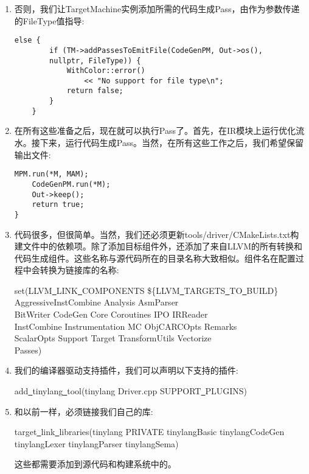 \begin{enumerate}
\item 否则，我们让TargetMachine实例添加所需的代码生成Pass，由作为参数传递的FileType值指导:
\begin{lstlisting}[caption={}]
	 else {
		if (TM->addPassesToEmitFile(CodeGenPM, Out->os(),
		nullptr, FileType)) {
			WithColor::error()
				<< "No support for file type\n";
			return false;
		}
	}
\end{lstlisting}

\item 在所有这些准备之后，现在就可以执行Pass了。首先，在IR模块上运行优化流水。接下来，运行代码生成Pass。当然，在所有这些工作之后，我们希望保留输出文件:
\begin{lstlisting}[caption={}]
	MPM.run(*M, MAM);
	CodeGenPM.run(*M);
	Out->keep();
	return true;
}
\end{lstlisting}

\item 代码很多，但很简单。当然，我们还必须更新tools/driver/CMakeLists.txt构建文件中的依赖项。除了添加目标组件外，还添加了来自LLVM的所有转换和代码生成组件。这些名称与源代码所在的目录名称大致相似。组件名在配置过程中会转换为链接库的名称:
\begin{tcolorbox}[colback=white,colframe=black]
set(LLVM\underline{~}LINK\underline{~}COMPONENTS \$\{LLVM\underline{~}TARGETS\underline{~}TO\underline{~}BUILD\} \\
\hspace*{0.5cm}AggressiveInstCombine Analysis AsmParser \\
\hspace*{0.5cm}BitWriter CodeGen Core Coroutines IPO IRReader \\
\hspace*{0.5cm}InstCombine Instrumentation MC ObjCARCOpts Remarks \\
\hspace*{0.5cm}ScalarOpts Support Target TransformUtils Vectorize \\
\hspace*{0.5cm}Passes)
\end{tcolorbox}

\item 我们的编译器驱动支持插件，我们可以声明以下支持的插件:
\begin{tcolorbox}[colback=white,colframe=black]
add\underline{~}tinylang\underline{~}tool(tinylang Driver.cpp SUPPORT\underline{~}PLUGINS)
\end{tcolorbox}

\item 和以前一样，必须链接我们自己的库:
\begin{tcolorbox}[colback=white,colframe=black]
target\underline{~}link\underline{~}libraries(tinylang
\hspace*{0.5cm}PRIVATE tinylangBasic tinylangCodeGen
\hspace*{0.5cm}tinylangLexer tinylangParser tinylangSema)
\end{tcolorbox}
这些都需要添加到源代码和构建系统中的。


\end{enumerate}
